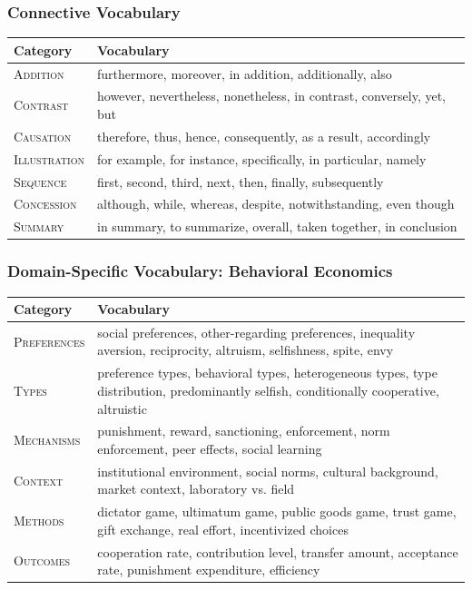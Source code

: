\subsubsection{Connective Vocabulary}

\begin{center}
\renewcommand{\arraystretch}{1.1}
\small
\begin{tabular}{p{2.5cm}p{10cm}}
\toprule
\textbf{Category} & \textbf{Vocabulary} \\
\midrule
\textsc{Addition} &
  furthermore, moreover, in addition, additionally, also \\
\textsc{Contrast} &
  however, nevertheless, nonetheless, in contrast, conversely, yet, but \\
\textsc{Causation} &
  therefore, thus, hence, consequently, as a result, accordingly \\
\textsc{Illustration} &
  for example, for instance, specifically, in particular, namely \\
\textsc{Sequence} &
  first, second, third, next, then, finally, subsequently \\
\textsc{Concession} &
  although, while, whereas, despite, notwithstanding, even though \\
\textsc{Summary} &
  in summary, to summarize, overall, taken together, in conclusion \\
\bottomrule
\end{tabular}
\end{center}

\subsubsection{Domain-Specific Vocabulary: Behavioral Economics}

\begin{center}
\renewcommand{\arraystretch}{1.1}
\small
\begin{tabular}{p{2.5cm}p{10cm}}
\toprule
\textbf{Category} & \textbf{Vocabulary} \\
\midrule
\textsc{Preferences} &
  social preferences, other-regarding preferences, inequality aversion,
  reciprocity, altruism, selfishness, spite, envy \\
\textsc{Types} &
  preference types, behavioral types, heterogeneous types, type distribution,
  predominantly selfish, conditionally cooperative, altruistic \\
\textsc{Mechanisms} &
  punishment, reward, sanctioning, enforcement, norm enforcement,
  peer effects, social learning \\
\textsc{Context} &
  institutional environment, social norms, cultural background,
  market context, laboratory vs. field \\
\textsc{Methods} &
  dictator game, ultimatum game, public goods game, trust game,
  gift exchange, real effort, incentivized choices \\
\textsc{Outcomes} &
  cooperation rate, contribution level, transfer amount, acceptance rate,
  punishment expenditure, efficiency \\
\bottomrule
\end{tabular}
\end{center}

